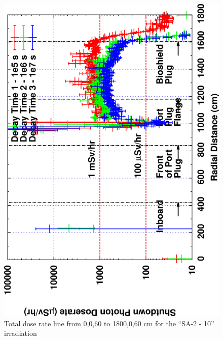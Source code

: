 \documentclass[12pt]{article}
\begin{document}
\begin{figure}[ht!]
\centering
\includegraphics[clip,scale=0.12,angle=-90]{../plots/photon_lineout/5yr/no-b4c_5yr.png}
\caption{Total dose rate line from 0,0,60 to 1800,0,60 cm for the ``SA-2 - 10'' irradiation}
\label{fig:photons_5y_nob4c_dose}
\end{figure}
\end{document}
